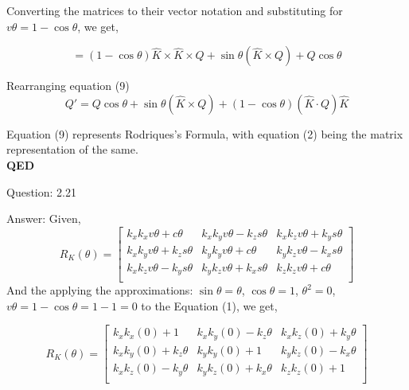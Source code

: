 \documentclass[a4paper]{article}
\begin{document}
\begin{qalist}
		Converting the matrices to their vector notation and substituting for \\$v\theta = 1 - \cos\theta$, we get,
		
		\begin{equation} = 
				(1-\cos\theta)\hat{K} \times \hat{K} \times Q
				+
				\sin\theta (\hat{K} \times Q)
				+
				Q\cos\theta
		\end{equation}
		
		Rearranging equation (9)
		\begin{equation}
			Q' = Q\cos\theta + \sin\theta(\hat{K} \times Q) + (1 - \cos\theta)(\hat{K} \cdot Q) \hat{K}
		\end{equation}
		
		Equation (9) represents Rodriques's Formula, with equation (2) being the matrix representation of the same.\\
		\textbf{QED} 
		
		\newpage
		\item[Question: 2.21] \setcounter{equation}{0} 
		\item[Answer:]
			Given, 
			\begin{equation}
			{R}_{K}(\theta) = 
				\left[ \begin{matrix} 
					\textit{${k}_{x}{k}_{x}v\theta + c\theta$} & \textit{${k}_{x}{k}_{y}v\theta - {k}_{z}s\theta$} & \textit{${k}_{x}{k}_{z}v\theta + {k}_{y}s\theta$} \\
					\textit{${k}_{x}{k}_{y}v\theta + {k}_{z}s\theta$} & \textit{${k}_{y}{k}_{y}v\theta + c\theta$} & \textit{${k}_{y}{k}_{z}v\theta - {k}_{x}s\theta$} \\
					\textit{${k}_{x}{k}_{z}v\theta - {k}_{y}s\theta$} & \textit{${k}_{y}{k}_{z}v\theta + {k}_{x}s\theta$} & \textit{${k}_{z}{k}_{z}v\theta + c\theta$} \\
				\end{matrix} \right]
			\end{equation}
			And the applying the approximations: 
				$\sin\theta = \theta$,
				$\cos\theta = 1$,
				$\theta^{2} = 0$,\\
				$v\theta = 1 - \cos\theta = 1 - 1 = 0$
			to the Equation (1), we get,
			
			\begin{equation}
				{R}_{K}(\theta) = 
				\left[ \begin{matrix} 
					\textit{${k}_{x}{k}_{x}(0) + 1$} & \textit{${k}_{x}{k}_{y}(0) - {k}_{z}\theta$} & \textit{${k}_{x}{k}_{z}(0) + {k}_{y}\theta$} \\
					\textit{${k}_{x}{k}_{y}(0) + {k}_{z}\theta$} & \textit{${k}_{y}{k}_{y}(0) + 1$} & \textit{${k}_{y}{k}_{z}(0) - {k}_{x}\theta$} \\
					\textit{${k}_{x}{k}_{z}(0) - {k}_{y}\theta$} & \textit{${k}_{y}{k}_{z}(0) + {k}_{x}\theta$} & \textit{${k}_{z}{k}_{z}(0) + 1$} \\
				\end{matrix} \right]
			\end{equation}
			

\end{qalist}
\end{document}
